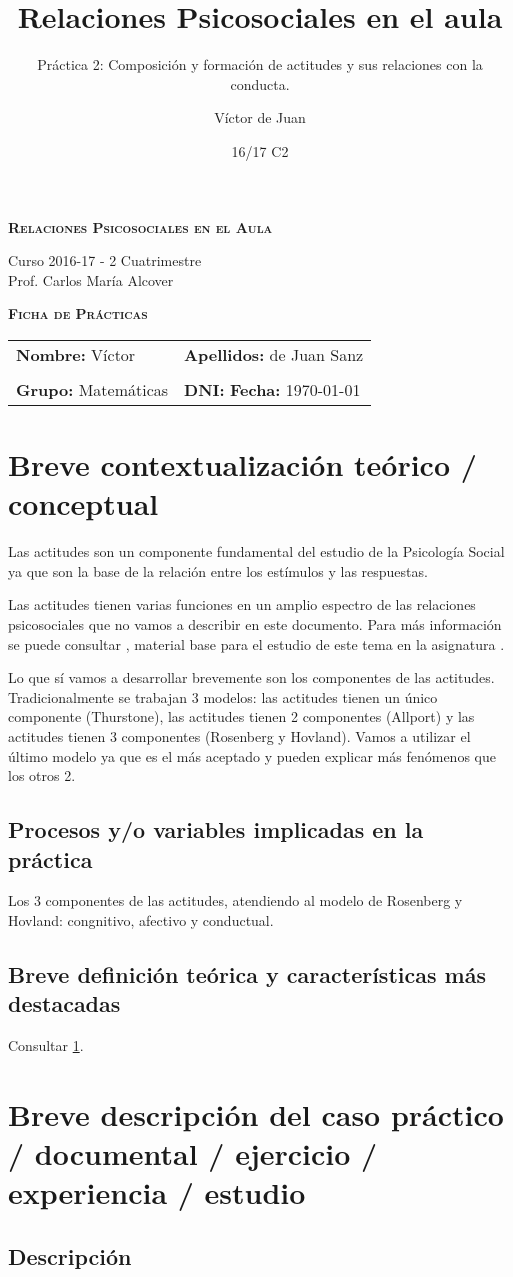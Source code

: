 \documentclass[palatino,nochap]{apuntesURJC}
\title{Relaciones Psicosociales en el aula}
\subtitle{Práctica 2: Composición y formación de actitudes y sus relaciones con la conducta.}
\author{Víctor de Juan}
\date{16/17 C2}
\newcommand{\makeheader}[1]{
\begin{center}
\Large \textbf{\textsc{Relaciones Psicosociales en el Aula}}\\
\end{center}
\begin{center}
\large Curso 2016-17 - 2 Cuatrimestre\\
Prof. Carlos María Alcover
\end{center}

\begin{center}
\Large \textbf{\textsc{Ficha de Prácticas}}
\end{center}

\begin{center}
\begin{tabular}{ll}
\hspace{2cm}\textbf{Nombre:} Víctor &  \hspace{1.5cm} \textbf{Apellidos:} de Juan Sanz\\
\vspace{0.3cm}&\\
\textbf{Grupo:} Matemáticas 	& \textbf{DNI:} %
 \hspace{3cm} \textbf{Fecha:} #1
\end{tabular}
\end{center}
}
\begin{document}
\pagestyle{plain}
\maketitle

\makeheader{\today}

\section{Breve contextualización teórico / conceptual}

\label{intro}

Las actitudes son un componente fundamental del estudio de la Psicología Social ya que son la base de la relación entre los estímulos y las respuestas.

Las actitudes tienen varias funciones en un amplio espectro de las relaciones psicosociales que no vamos a describir en este documento.
%
Para más información se puede consultar \cite{Tema2}, material base para el estudio de este tema en la asignatura \thetitle.

Lo que sí vamos a desarrollar brevemente son los componentes de las actitudes. 
%
Tradicionalmente se trabajan 3 modelos: las actitudes tienen un único componente (Thurstone), las actitudes tienen 2 componentes (Allport) y las actitudes tienen 3 componentes (Rosenberg y Hovland).
%
Vamos a utilizar el último modelo ya que es el más aceptado y pueden explicar más fenómenos que los otros 2.


\subsection{Procesos y/o variables implicadas en la práctica}

Los 3 componentes de las actitudes, atendiendo al modelo de Rosenberg y Hovland: congnitivo, afectivo y conductual.

\subsection{Breve definición teórica y características más destacadas}

Consultar \ref{intro}.

\section{Breve descripción del caso práctico / documental / ejercicio / experiencia / estudio}

\subsection{Descripción}
\end{document}
